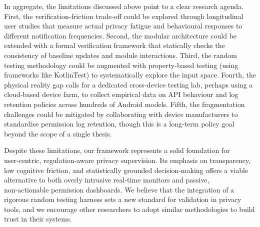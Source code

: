 In aggregate, the limitations discussed above point to a clear research agenda. First, the verification‑friction trade‑off could be explored through longitudinal user studies that measure actual privacy fatigue and behavioural responses to different notification frequencies. Second, the modular architecture could be extended with a formal verification framework that statically checks the consistency of baseline updates and module interactions. Third, the random testing methodology could be augmented with property‑based testing (using frameworks like KotlinTest) to systematically explore the input space. Fourth, the physical reality gap calls for a dedicated cross‑device testing lab, perhaps using a cloud‑based device farm, to collect empirical data on API behaviour and log retention policies across hundreds of Android models. Fifth, the fragmentation challenges could be mitigated by collaborating with device manufacturers to standardise permission log retention, though this is a long‑term policy goal beyond the scope of a single thesis.

Despite these limitations, our framework represents a solid foundation for user‑centric, regulation‑aware privacy supervision. Its emphasis on transparency, low cognitive friction, and statistically grounded decision‑making offers a viable alternative to both overly intrusive real‑time monitors and passive, non‑actionable permission dashboards. We believe that the integration of a rigorous random testing harness sets a new standard for validation in privacy tools, and we encourage other researchers to adopt similar methodologies to build trust in their systems.
